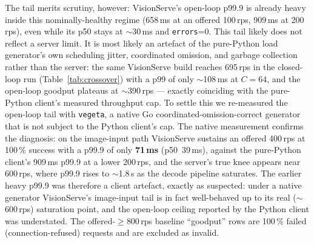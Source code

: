 The tail merits scrutiny, however: VisionServe's open-loop
p99.9 is already heavy inside this nominally-healthy regime (658\,ms at an offered 100\,rps,
909\,ms at 200\,rps), even while its p50 stays at $\sim$30\,ms and \texttt{errors}=0.  This
tail likely does not reflect a server limit.  It is most likely an artefact of the
pure-Python load generator's own scheduling jitter, coordinated omission, and garbage
collection rather than the server: the same VisionServe build reaches 695\,rps in the
closed-loop run (Table~\ref{tab:crossover}) with a p99 of only $\sim$108\,ms at $C{=}64$, and
the open-loop goodput plateaus at $\sim$390\,rps — exactly coinciding with the pure-Python
client's measured throughput cap.  To settle this we re-measured the open-loop tail with
\texttt{vegeta}, a native Go coordinated-omission-correct generator that is not subject to the
Python client's cap.  The native measurement confirms the diagnosis: on the image-input path
VisionServe sustains an offered 400\,rps at 100\,\% success with a p99.9 of only \textbf{71\,ms}
(p50~39\,ms), against the pure-Python client's 909\,ms p99.9 at a lower 200\,rps,
and the server's true knee appears near 600\,rps, where p99.9 rises to $\sim$1.8\,s as the
decode pipeline saturates.  The earlier heavy p99.9 was therefore a client artefact, exactly as
suspected: under a native generator VisionServe's image-input tail is in fact well-behaved up to
its real ($\sim$600\,rps) saturation point, and the open-loop ceiling reported by the Python
client was understated.  The offered-$\geq$800\,rps baseline ``goodput'' rows are 100\,\% failed
(connection-refused) requests and are excluded as invalid.


